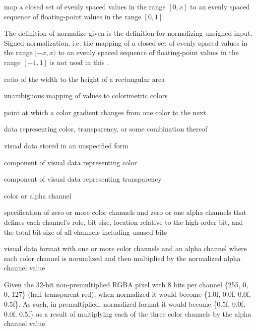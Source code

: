 %
map a closed set of evenly spaced values in the range $[0, x]$ to an evenly spaced sequence of floating-point values in the range $[0, 1]$
\begin{note}
The definition of normalize given is the definition for normalizing unsigned input. Signed normalization, i.e. the mapping of a closed set of evenly spaced values in the range $[-x, x)$ to an evenly spaced sequence of floating-point values in the range $[-1, 1]$ is not used in this \documenttypename{}.
\end{note}

%
ratio of the width to the height of a rectangular area

%
unambiguous mapping of values to colorimetric colors

%
point at which a color gradient changes from one color to the next

%
data representing color, transparency, or some combination thereof

%
visual data stored in an unspecified form

%
 component of visual data representing color

%
 component of visual data representing transparency

%
color or alpha channel

%
specification of zero or more color channels and zero or one alpha channels that defines each channel's role, bit size, location relative to the high-order bit, and the total bit size of all channels including unused bits

%
visual data format with one or more color channels and an alpha channel where each color channel is normalized and then multiplied by the normalized alpha channel value
\begin{example}
Given the 32-bit non-premultiplied RGBA pixel with 8 bits per channel \{255, 0, 0, 127\} (half-transparent red), when normalized it would become \{1.0f, 0.0f, 0.0f, 0.5f\}. As such, in premultiplied, normalized format it would become \{0.5f, 0.0f, 0.0f, 0.5f\} as a result of multiplying each of the three color channels by the alpha channel value.
\end{example}

